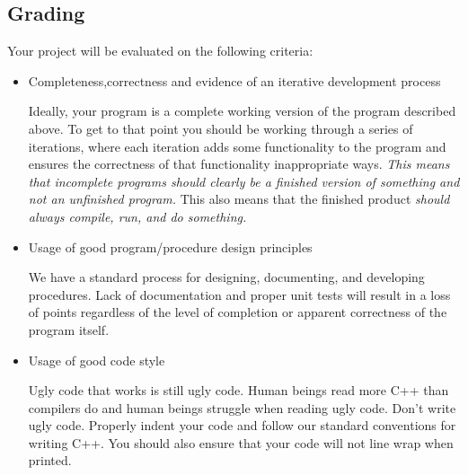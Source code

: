 \documentclass[]{tufte-handout}
\begin{document}
\subsection{Grading}

Your project will be evaluated on the following criteria:
\begin{itemize}
\item Completeness,correctness and evidence of an iterative development process

Ideally, your program is a complete working version of the program described above. To get to that point you should be working through a series of iterations, where each iteration adds some functionality to the program and ensures the correctness of that functionality inappropriate ways.  \textit{This means that incomplete programs should clearly be a finished version of something and not an unfinished program.} This also means that the finished product \textit{should always compile, run, and do something.} 

\item Usage of good program/procedure design principles

We have a standard process for designing, documenting, and developing procedures. Lack of documentation and proper unit tests will result in a loss of points regardless of the level of completion or apparent correctness of the program itself.

\item Usage of good code style

Ugly code that works is still ugly code. Human beings read more C++ than compilers do and human beings struggle when reading ugly code. Don't write ugly code.  Properly indent your code and follow our standard conventions for writing C++.  You should also ensure that your code will not line wrap when printed.
\end{itemize}
\end{document}
